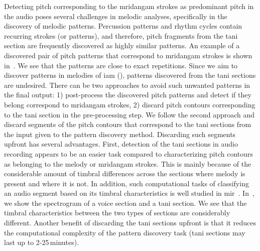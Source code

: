 {Detecting pitch corresponding to the \gls{mridangam} strokes as predominant pitch in the audio poses several challenges in melodic analyses, specifically in the discovery of melodic patterns. Percussion patterns and rhythm cycles contain recurring strokes (or patterns), and therefore, pitch fragments from the \gls{tani} section are frequently discovered as highly similar patterns. An example of a discovered pair of pitch patterns that correspond to \gls{mridangam} strokes is shown in~. We see that the patterns are close to exact repetitions. Since we aim to discover patterns in melodies of \gls{iam} (), patterns discovered from the \gls{tani} sections are undesired. There can be two approaches to avoid such unwanted patterns in the final output: 1) post-process the discovered pitch patterns and detect if they belong correspond to \gls{mridangam} strokes, 2) discard pitch contours corresponding to the \gls{tani} section in the pre-processing step. We follow the second approach and discard segments of the pitch contours that correspond to the \gls{tani} sections from the input given to the pattern discovery method. Discarding such segments upfront has several advantages. First, detection of the \gls{tani} sections in audio recording appears to be an easier task compared to characterizing pitch contours as belonging to the melody or \gls{mridangam} strokes. This is mainly because of the considerable amount of timbral differences across the sections where melody is present and where it is not. In addition, such computational tasks of classifying an audio segment based on its timbral characteristics is well studied in \gls{mir}~\citep{herrera2003automatic}. In~, we show the spectrogram of a voice section and a \gls{tani} section. We see that the timbral characteristics between the two types of sections are considerably different. Another benefit of discarding the \gls{tani} sections upfront is that it reduces the computational complexity of the pattern discovery task (\gls{tani} sections may last up to 2-25\,minutes). %

}
